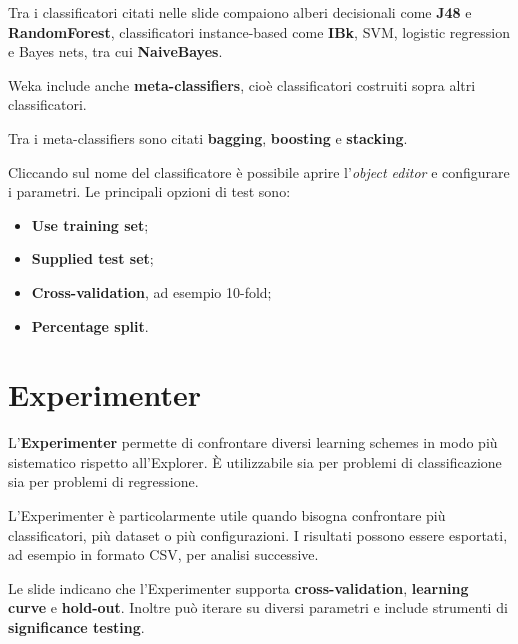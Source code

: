 \begin{notaslide}
Tra i classificatori citati nelle slide compaiono alberi decisionali come \textbf{J48} e \textbf{RandomForest}, classificatori instance-based come \textbf{IBk}, SVM, logistic regression e Bayes nets, tra cui \textbf{NaiveBayes}.
\end{notaslide}

Weka include anche \textbf{meta-classifiers}, cioè classificatori costruiti sopra altri classificatori.

\begin{notaslide}
Tra i meta-classifiers sono citati \textbf{bagging}, \textbf{boosting} e \textbf{stacking}.
\end{notaslide}

Cliccando sul nome del classificatore è possibile aprire l'\emph{object editor} e configurare i parametri. Le principali opzioni di test sono:

\begin{itemize}
    \item \textbf{Use training set};
    \item \textbf{Supplied test set};
    \item \textbf{Cross-validation}, ad esempio 10-fold;
    \item \textbf{Percentage split}.
\end{itemize}

\section{Experimenter}

L'\textbf{Experimenter} permette di confrontare diversi learning schemes in modo più sistematico rispetto all'Explorer. È utilizzabile sia per problemi di classificazione sia per problemi di regressione.

\begin{notaprof}
L'Experimenter è particolarmente utile quando bisogna confrontare più classificatori, più dataset o più configurazioni. I risultati possono essere esportati, ad esempio in formato CSV, per analisi successive.
\end{notaprof}

\begin{notaslide}
Le slide indicano che l'Experimenter supporta \textbf{cross-validation}, \textbf{learning curve} e \textbf{hold-out}. Inoltre può iterare su diversi parametri e include strumenti di \textbf{significance testing}.
\end{notaslide}

